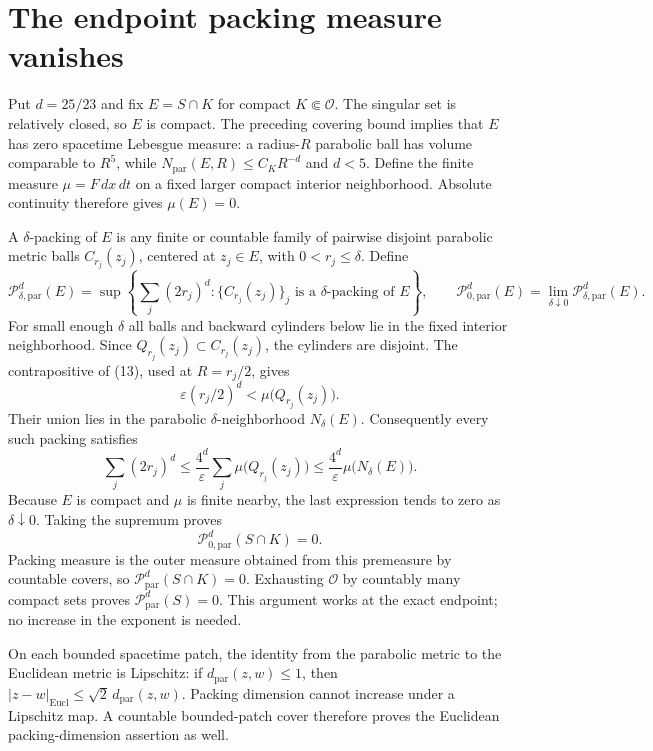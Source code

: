\documentclass[11pt]{article}
\begin{document}
\section{The endpoint packing measure vanishes}
Put $d=25/23$ and fix $E=S\cap K$ for compact $K\Subset\mathcal O$. The singular set is relatively closed, so $E$ is compact. The preceding covering bound implies that $E$ has zero spacetime Lebesgue measure: a radius-$R$ parabolic ball has volume comparable to $R^5$, while $N_{\mathrm{par}}(E,R)\le C_KR^{-d}$ and $d<5$. Define the finite measure $\mu=F\,dx\,dt$ on a fixed larger compact interior neighborhood. Absolute continuity therefore gives $\mu(E)=0$.

A $\delta$-packing of $E$ is any finite or countable family of pairwise disjoint parabolic metric balls $C_{r_j}(z_j)$, centered at $z_j\in E$, with $0<r_j\le\delta$. Define
$$
\mathcal P^d_{\delta,\mathrm{par}}(E)
=\sup\left\{\sum_j(2r_j)^d:
\{C_{r_j}(z_j)\}_j\text{ is a }\delta\text{-packing of }E\right\},
\qquad
\mathcal P^d_{0,\mathrm{par}}(E)
=\lim_{\delta\downarrow0}\mathcal P^d_{\delta,\mathrm{par}}(E).
$$
For small enough $\delta$ all balls and backward cylinders below lie in the fixed interior neighborhood. Since $Q_{r_j}(z_j)\subset C_{r_j}(z_j)$, the cylinders are disjoint. The contrapositive of (13), used at $R=r_j/2$, gives
$$
\varepsilon(r_j/2)^d
<\mu\bigl(Q_{r_j}(z_j)\bigr).
$$
Their union lies in the parabolic $\delta$-neighborhood $N_\delta(E)$. Consequently every such packing satisfies
$$
\sum_j(2r_j)^d
\le\frac{4^d}{\varepsilon}\sum_j\mu\bigl(Q_{r_j}(z_j)\bigr)
\le\frac{4^d}{\varepsilon}\mu\bigl(N_\delta(E)\bigr).
$$
Because $E$ is compact and $\mu$ is finite nearby, the last expression tends to zero as $\delta\downarrow0$. Taking the supremum proves
$$
\mathcal P^d_{0,\mathrm{par}}(S\cap K)=0.
$$
Packing measure is the outer measure obtained from this premeasure by countable covers, so $\mathcal P^d_{\mathrm{par}}(S\cap K)=0$. Exhausting $\mathcal O$ by countably many compact sets proves $\mathcal P^d_{\mathrm{par}}(S)=0$. This argument works at the exact endpoint; no increase in the exponent is needed.

On each bounded spacetime patch, the identity from the parabolic metric to the Euclidean metric is Lipschitz: if $d_{\mathrm{par}}(z,w)\le1$, then $|z-w|_{\mathrm{Eucl}}\le\sqrt2\,d_{\mathrm{par}}(z,w)$. Packing dimension cannot increase under a Lipschitz map. A countable bounded-patch cover therefore proves the Euclidean packing-dimension assertion as well.
\end{document}
